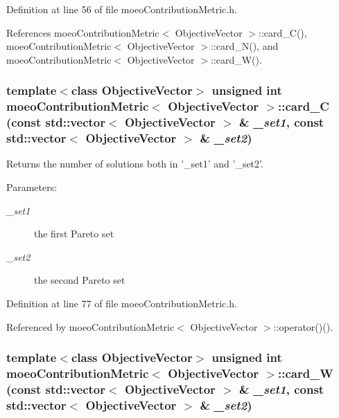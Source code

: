 Definition at line 56 of file moeo\-Contribution\-Metric.h.

References moeo\-Contribution\-Metric$<$ Objective\-Vector $>$::card\_\-C(), moeo\-Contribution\-Metric$<$ Objective\-Vector $>$::card\_\-N(), and moeo\-Contribution\-Metric$<$ Objective\-Vector $>$::card\_\-W().
\subsubsection{\setlength{\rightskip}{0pt plus 5cm}template$<$class Objective\-Vector$>$ unsigned int \bf{moeo\-Contribution\-Metric}$<$ Objective\-Vector $>$::card\_\-C (const std::vector$<$ Objective\-Vector $>$ \& {\em \_\-set1}, const std::vector$<$ Objective\-Vector $>$ \& {\em \_\-set2})\hspace{0.3cm}{\tt  [inline, private]}}\label{classmoeoContributionMetric_4e60849763aaad0cdea66e71edf2d29e}


Returns the number of solutions both in '\_\-set1' and '\_\-set2'. 

\begin{Desc}
\item[Parameters:]
\begin{description}
\item[{\em \_\-set1}]the first Pareto set \item[{\em \_\-set2}]the second Pareto set \end{description}
\end{Desc}


Definition at line 77 of file moeo\-Contribution\-Metric.h.

Referenced by moeo\-Contribution\-Metric$<$ Objective\-Vector $>$::operator()().
\subsubsection{\setlength{\rightskip}{0pt plus 5cm}template$<$class Objective\-Vector$>$ unsigned int \bf{moeo\-Contribution\-Metric}$<$ Objective\-Vector $>$::card\_\-W (const std::vector$<$ Objective\-Vector $>$ \& {\em \_\-set1}, const std::vector$<$ Objective\-Vector $>$ \& {\em \_\-set2})\hspace{0.3cm}{\tt  [inline, private]}}\label{classmoeoContributionMetric_68d6d1ec1ed0bed1ea290cdacb93b5b2}


